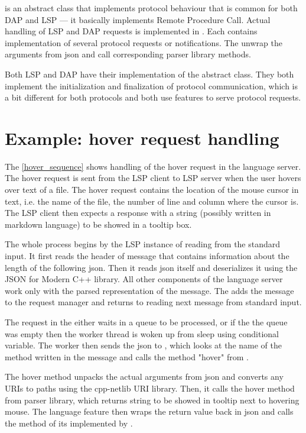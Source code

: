  is an abstract class that implements protocol behaviour that is common for both DAP and LSP --- it basically implements Remote Procedure Call. Actual handling of LSP and DAP requests is implemented in . Each  contains implementation of several protocol requests or notifications. The  unwrap the arguments from json and call corresponding parser library methods.

Both LSP and DAP have their implementation of the abstract  class. They both implement the initialization and finalization of protocol communication, which is a bit different for both protocols and both use features to serve protocol requests.

\section{Example: hover request handling}

The \cref{hover_sequence} shows handling of the hover request in the language server. The hover request is sent from the LSP client to LSP server when the user hovers over text of a file. The hover request contains the location of the mouse cursor in text, i.e. the name of the file, the number of line and column where the cursor is. The LSP client then expects a response with a string (possibly written in markdown language) to be showed in a tooltip box.

The whole process begins by the LSP instance of  reading from the standard input. It first reads the header of message that contains information about the length of the following json. Then it reads json itself and deserializes it using the JSON for Modern C++ library. All other components of the language server work only with the parsed representation of the message. The  adds the message to the request manager and returns to reading next message from standard input.

The request in the  either waits in a queue to be processed, or if the the queue was empty then the worker thread is woken up from sleep using conditional variable. The worker then sends the json to , which looks at the name of the method written in the message and calls the method "hover" from .

The hover method unpacks the actual arguments from json and converts any URIs to paths using the cpp-netlib URI library. Then, it calls the hover method from parser library, which returns string to be showed in tooltip next to hovering mouse. The language feature then wraps the return value back in json and calls the  method of its  implemented by .

